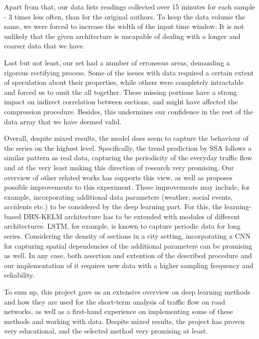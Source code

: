Apart from that, our data lists readings collected over 15 minutes for each
sample - 3 times less often, than for the original authors. To keep the data
volume the same, we were forced to increase the width of the input time window.
It is not unlikely that the given architecture is uncapable of dealing with a
longer and coarser data that we have.

Last but not least, our set had a number of erroneous areas, demanding a
rigorous rectifying process. Some of the issues with data required a certain
extent of speculation about their properties, while others were completely
intractable and forced us to omit the all together. These missing portions have
a strong impact on indirect correlation between sections, and might have
affected the compression procedure. Besides, this undermines our confidence in
the rest of the data array that we have deemed valid.

Overall, despite mixed results, the model does seem to capture the behaviour of
the series on the highest level. Specifically, the trend prediction by SSA
follows a similar pattern as real data, capturing the periodicity of the
everyday traffic flow and at the very least making this direction of research
very promising. Our overview of other related works has supports this view, as
well as proposes possible improvements to this experiment. These improvements
may include, for example, incorporating additional data parameters (weather,
social events, accidents etc.) to be considered by the deep learning part. For
this, the learning-based DBN-KELM architecture has to be extended with modules
of different architectures. LSTM, for example, is known to capture periodic data
for long series. Considering the density of sections in a city setting,
incorporating a CNN for capturing spatial dependencies of the additional
parameters can be promising as well. In any case, both assertion and extention
of the described procedure and our implementation of it requires new data with a
higher sampling frequency and reliability.

To sum up, this project gave us an extensive overview on deep learning methods
and how they are used for the short-term analysis of traffic flow on road
networks, as well as a first-hand experience on implementing some of these
methods and working with data. Despite mixed results, the project has proven
very educational, and the selected method very promising at least.
